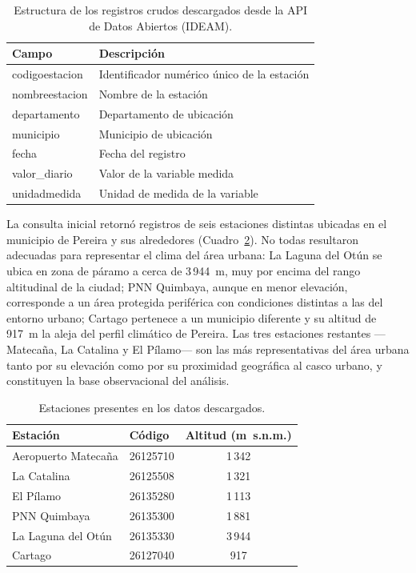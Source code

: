 \documentclass[12pt, a4paper]{article}
\begin{document}
\begin{table}[h]
	\centering
	\caption{Estructura de los registros crudos descargados desde la API de Datos Abiertos (IDEAM).}
	\label{tab:estructura}
	\begin{tabular}{ll}
		\toprule
		Campo & Descripción \\
		\midrule
		codigoestacion & Identificador numérico único de la estación \\
		nombreestacion & Nombre de la estación \\
		departamento   & Departamento de ubicación \\
		municipio      & Municipio de ubicación \\
		fecha          & Fecha del registro \\
		valor\_diario  & Valor de la variable medida \\
		unidadmedida   & Unidad de medida de la variable \\
		\bottomrule
	\end{tabular}
\end{table}

La consulta inicial retornó registros de seis estaciones distintas ubicadas en el
municipio de Pereira y sus alrededores (Cuadro~\ref{tab:estaciones_todas}). No todas
resultaron adecuadas para representar el clima del área urbana: La Laguna del Otún
se ubica en zona de páramo a cerca de 3\,944~m, muy por encima del rango altitudinal
de la ciudad; PNN Quimbaya, aunque en menor elevación, corresponde a un área protegida
periférica con condiciones distintas a las del entorno urbano; Cartago pertenece a un
municipio diferente y su altitud de 917~m la aleja del perfil climático de Pereira.
Las tres estaciones restantes ---Matecaña, La Catalina y El Pílamo--- son las más
representativas del área urbana tanto por su elevación como por su proximidad
geográfica al casco urbano, y constituyen la base observacional del análisis.

\begin{table}[h]
	\centering
	\caption{Estaciones presentes en los datos descargados.}
	\label{tab:estaciones_todas}
	\begin{tabular}{llc}
		\toprule
		Estación & Código & Altitud (m~s.n.m.)  \\
		\midrule
		Aeropuerto Matecaña  & 26125710 & 1\,342 \\
		La Catalina          & 26125508 & 1\,321  \\
		El Pílamo            & 26135280 & 1\,113  \\
		PNN Quimbaya         & 26135300 & 1\,881  \\
		La Laguna del Otún   & 26135330 & 3\,944 \\
		Cartago              & 26127040 &    917 \\
		\bottomrule
	\end{tabular}
\end{table}
\end{document}
